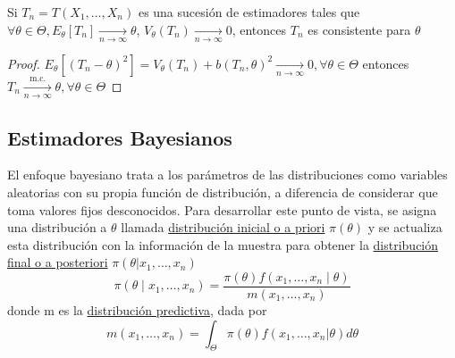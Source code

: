 \begin{proposición}
  Si $T_{n} = T(X_1, \ldots, X_n)$ es una sucesión de estimadores tales que $\forall \theta \in \Theta, E_{\theta}[T_n] \underset{n \to \infty}{\longrightarrow} \theta$, $V_{\theta}(T_n) \underset{n \to \infty}{\longrightarrow} 0$, entonces $T_n$ es consistente para $\theta$
\end{proposición}
\begin{proof}
  $E_{\theta}\left[\left(T_{n}-\theta\right)^{2}\right]=V_{\theta}\left(T_{n}\right)+b\left(T_{n}, \theta\right)^{2} \underset{n \rightarrow \infty}{\longrightarrow} 0, \forall \theta \in \Theta$ entonces $T_{n} \xrightarrow[n \rightarrow \infty]{\text { m.c. }} \theta, \forall \theta \in \Theta$ 
\end{proof}



\subsection{Estimadores Bayesianos}


\begin{definición}
  El enfoque bayesiano trata a los parámetros de las distribuciones como variables aleatorias con su propia función de distribución, a diferencia de considerar que toma valores fijos desconocidos. Para desarrollar este punto de vista, se asigna una distribución a $\theta$ llamada \underline{distribución inicial o a priori} $\pi(\theta)$ y se actualiza esta distribución con la información de la muestra para obtener la \underline{distribución final o a posteriori} $\pi(\theta | x_1, \ldots, x_n)$
  $$\pi\left(\theta \mid x_{1}, \ldots, x_{n}\right)=\frac{\pi(\theta) f\left(x_{1}, \ldots, x_{n} \mid \theta\right)}{m\left(x_{1}, \ldots, x_{n}\right)}$$  
  donde m es la \underline{distribución predictiva}, dada por 
  $$m(x_1, \ldots, x_n) = \int_{\Theta} \pi(\theta)f(x_1, \ldots, x_n | \theta)d\theta$$
\end{definición}

